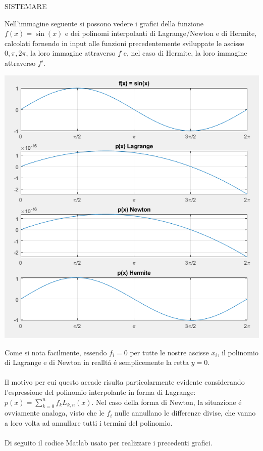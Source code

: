 \begin{center}
\footnotesize\noindent{}\end{center}

SISTEMARE

\noindent Nell'immagine seguente si possono vedere i grafici della funzione \(f(x) = \sin(x)\) e dei polinomi interpolanti di Lagrange/Newton e di Hermite, calcolati fornendo in input alle funzioni precedentemente sviluppate le ascisse \(0, \pi, 2\pi \), la loro immagine attraverso \(f\) e, nel caso di Hermite, la loro immagine attraverso \(f'\).
\begin{center}
	\includegraphics[scale=0.7]{cap4/4_4.png}
\end{center}
\noindent Come si nota facilmente, essendo \(f_i=0\) per tutte le nostre ascisse \(x_i\), il polinomio di Lagrange e di Newton in reallt\'a \'e semplicemente la retta \(y=0\). \\ \\
\noindent Il motivo per cui questo accade risulta particolarmente evidente considerando l'espressione del polinomio interpolante in forma di Lagrange: \( p(x) = \sum_{k=0}^{n}f_{k}L_{k,n}(x) \). Nel caso della forma di Newton, la situazione \'e ovviamente analoga, visto che le \(f_i\) nulle annullano le differenze divise, che vanno a loro volta ad annullare tutti i termini del polinomio. \\ \\
\noindent Di seguito il codice Matlab usato per realizzare i precedenti grafici.


